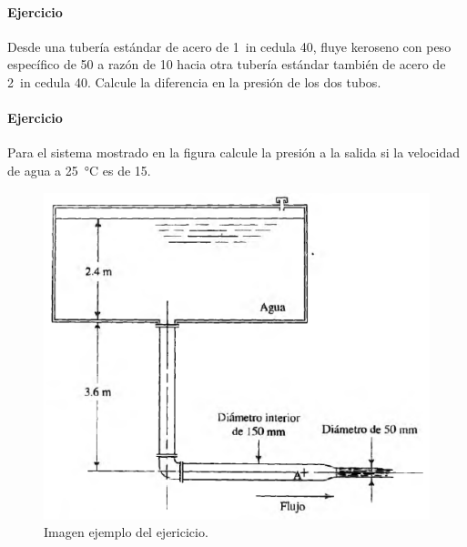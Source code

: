 \documentclass[]{article}
\begin{document}

\paragraph{Ejercicio}
Desde una tubería estándar de acero de \SI{1}{in} cedula 40, fluye keroseno con peso específico de \SI{50}{} a razón de \SI{10}{} hacia otra tubería estándar también de acero de \SI{2}{in} cedula 40. Calcule la diferencia en la presión de los dos tubos.


\paragraph{Ejercicio}
Para el sistema mostrado en la figura calcule la presión a la salida si la velocidad de agua a \SI{25}{\celsius} es de \SI{15}{\frac{\meter}{\second}}.

\begin{figure}[h!]
	\centering
	\includegraphics[width=0.7\linewidth]{img/4.png}
	\caption{Imagen ejemplo del ejericicio.}
	\label{fig:io_4}
\end{figure}
\end{document}
